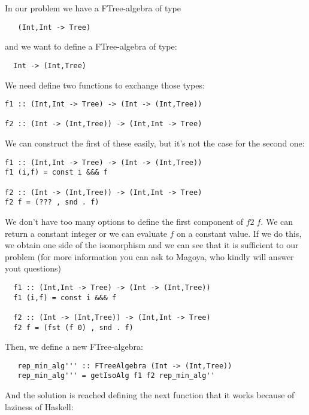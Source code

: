 \documentclass[a4paper,10pt]{article}
\begin{document}
In our problem we have a FTree-algebra of type
  
\begin{lstlisting}
   (Int,Int -> Tree)
\end{lstlisting}

\noindent and we want to define a FTree-algebra of type:

\begin{lstlisting}
  Int -> (Int,Tree)
\end{lstlisting} 

We need define two functions to exchange those types:
  
\begin{lstlisting}
f1 :: (Int,Int -> Tree) -> (Int -> (Int,Tree))
  
f2 :: (Int -> (Int,Tree)) -> (Int,Int -> Tree)
\end{lstlisting}

We can construct the first of these easily, but it's not the case for the second one:

\begin{lstlisting}
f1 :: (Int,Int -> Tree) -> (Int -> (Int,Tree))
f1 (i,f) = const i &&& f

f2 :: (Int -> (Int,Tree)) -> (Int,Int -> Tree)
f2 f = (??? , snd . f)
\end{lstlisting}

We don't have too many options to define the first component of $f2\;f$. We can
return a constant integer or we can evaluate $f$ on a constant value. If we do this,
we obtain one side of the isomorphism and we can see that it is sufficient to our problem
(for more information you can ask to Magoya, who kindly will answer yout questions)

  \begin{lstlisting}
  f1 :: (Int,Int -> Tree) -> (Int -> (Int,Tree))
  f1 (i,f) = const i &&& f

  f2 :: (Int -> (Int,Tree)) -> (Int,Int -> Tree)
  f2 f = (fst (f 0) , snd . f)
  \end{lstlisting}

  Then, we define a new FTree-algebra:
  
  \begin{lstlisting}
   rep_min_alg''' :: FTreeAlgebra (Int -> (Int,Tree))
   rep_min_alg''' = getIsoAlg f1 f2 rep_min_alg''
  \end{lstlisting}

  And the solution is reached defining the next function that it works because of laziness of Haskell:
  
\end{document}
